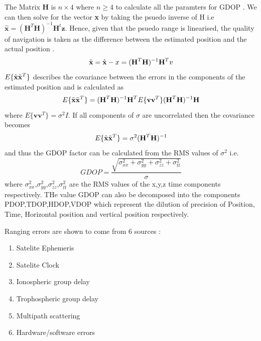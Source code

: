 The Matrix \textbf{H} is $n\times4$ where $n \geq 4$ to calculate all the paramters for GDOP \cite{jwo2001efficient}. We can then solve for the vector \textbf{x} by taking the psuedo inverse of H i.e $\hat{\textbf{x}} = (\textbf{H}^T\textbf{H})^{-1}\textbf{H}^t\textbf{z}$. Hence, given that the psuedo range is linearised, the quality of navigation is taken as the difference between the estimated position and the actual position \cite{jwo2001efficient}.
\begin{equation}
	\Tilde{\textbf{x}} = \hat{\textbf{x}} - x = (\textbf{H}^T\textbf{H})^{-1}\textbf{H}^Tv
\end{equation}
$E\{\Tilde{\textbf{x}}\Tilde{\textbf{x}}^T\}$ describes the covariance between the errors in the components of the estimated position \cite{jwo2001efficient} and is calculated as 
\begin{equation}
	E\{\Tilde{\textbf{x}}\Tilde{\textbf{x}}^T\} = (\textbf{H}^T\textbf{H})^{-1}\textbf{H}^TE\{\textbf{vv}^T\} (\textbf{H}^T\textbf{H})^{-1}\textbf{H}
\end{equation}
where $E\{\textbf{vv}^T\} = \sigma^2 I$. If all components of $\sigma$ are uncorrelated then the covariance becomes 
\begin{equation}
	E\{\Tilde{\textbf{x}}\Tilde{\textbf{x}}^T\} = \sigma^2(\textbf{H}^T\textbf{H})^{-1}
\end{equation}
and thus the GDOP factor can be calculated from the RMS values of $\sigma^2$ i.e.
\begin{equation}
	GDOP = \frac{\sqrt{\sigma_{xx}^2+\sigma_{yy}^2+ \sigma_{zz}^2+\sigma_{tt}^2}}{\sigma}
\end{equation} where $\sigma_{xx}^2$,$\sigma_{yy}^2$,$\sigma_{zz}^2$,$\sigma_{tt}^2$ are the RMS values of the x,y,z time components respectively. THe value GDOP can also be decomposed into the components PDOP,TDOP,HDOP,VDOP which represent the dilution of precision of Position, Time, Horizontal position and vertical position respectively.\par

Ranging errors are shown to come from 6 sources \cite{spilker1996global}:
\begin{enumerate}
	\item Satelite Ephemeris
	\item Satelite Clock
	\item Ionospheric group delay
	\item Trophospheric group delay
	\item Multipath scattering
	\item Hardware/software errors
\end{enumerate}





